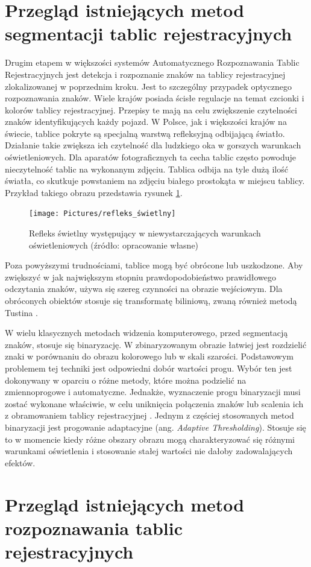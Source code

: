 \section{Przegląd istniejących metod segmentacji tablic rejestracyjnych}

Drugim etapem w większości systemów Automatycznego Rozpoznawania Tablic Rejestracyjnych jest detekcja i rozpoznanie znaków na tablicy rejestracyjnej zlokalizowanej w poprzednim kroku.
Jest to szczególny przypadek optycznego rozpoznawania znaków.
Wiele krajów posiada ścisłe regulacje na temat czcionki i kolorów tablicy rejestracyjnej.
Przepisy te mają na celu zwiększenie czytelności znaków identyfikujących każdy pojazd.
W Polsce, jak i większości krajów na świecie, tablice pokryte są specjalną warstwą refleksyjną odbijającą światło.
Działanie takie zwiększa ich czytelność dla ludzkiego oka w gorszych warunkach oświetleniowych.
Dla aparatów fotograficznych ta cecha tablic często powoduje nieczytelność tablic na wykonanym zdjęciu.
Tablica odbija na tyle dużą ilość światła, co skutkuje powstaniem na zdjęciu białego prostokąta w miejscu tablicy.
Przykład takiego obrazu przedstawia rysunek \ref{fig:refleks_swietlny}.
\begin{figure}[!ht]
    \centering
    \texttt{[image: Pictures/refleks\_świetlny]}
    \caption{Refleks świetlny występujący w niewystarczających warunkach oświetleniowych (źródło: opracowanie własne)}
    \label{fig:refleks_swietlny}
\end{figure}
\FloatBarrier
Poza powyższymi trudnościami, tablice mogą być obrócone lub uszkodzone.
Aby zwiększyć w jak największym stopniu prawdopodobieństwo prawidłowego odczytania znaków, używa się szereg czynności na obrazie wejściowym.
Dla obróconych obiektów stosuje się transformatę biliniową, zwaną również metodą Tustina \cite{Xu2006AMO}.

W wielu klasycznych metodach widzenia komputerowego, przed segmentacją znaków, stosuje się binaryzację.
W zbinaryzowanym obrazie łatwiej jest rozdzielić znaki w porównaniu do obrazu kolorowego lub w skali szarości.
Podstawowym problemem tej techniki jest odpowiedni dobór wartości progu.
Wybór ten jest dokonywany w oparciu o różne metody, które można podzielić na zmiennoprogowe i automatyczne.
Jednakże, wyznaczenie progu binaryzacji musi zostać wykonane właściwie, w celu uniknięcia połączenia znaków lub scalenia ich z obramowaniem tablicy rejestracyjnej \cite{6213519}.
Jednym z częściej stosowanych metod binaryzacji jest progowanie adaptacyjne (ang. \textit{Adaptive Thresholding}).
Stosuje się to w momencie kiedy różne obszary obrazu mogą charakteryzować się różnymi warunkami oświetlenia i stosowanie stałej wartości nie dałoby zadowalających efektów.


\section{Przegląd istniejących metod rozpoznawania tablic rejestracyjnych}
